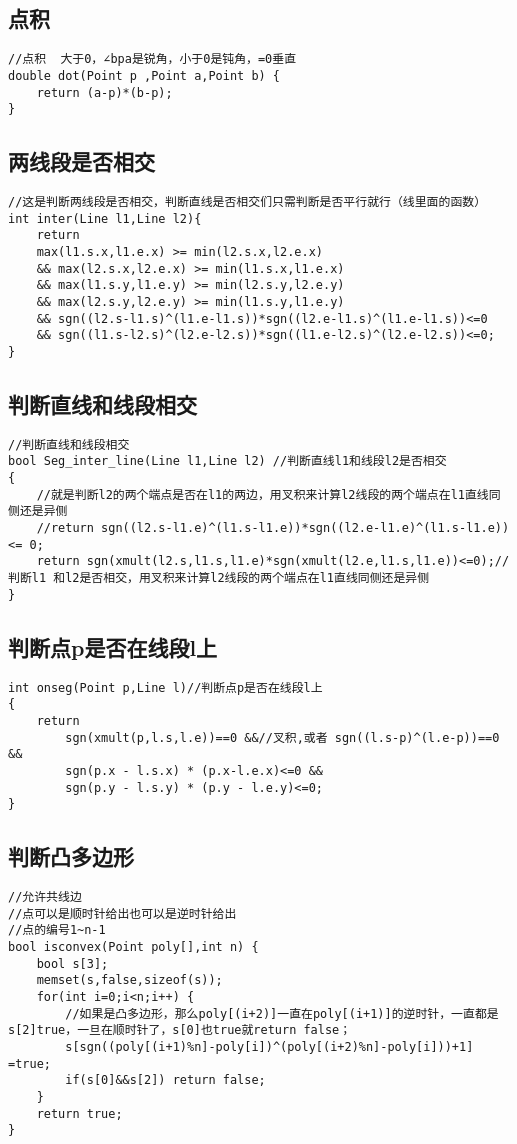 \subsection{点积}
\begin{lstlisting}
//点积  大于0，∠bpa是锐角，小于0是钝角，=0垂直
double dot(Point p ,Point a,Point b) {
	return (a-p)*(b-p);
}
\end{lstlisting}

\subsection{两线段是否相交}
\begin{lstlisting}
//这是判断两线段是否相交，判断直线是否相交们只需判断是否平行就行（线里面的函数）
int inter(Line l1,Line l2){
	return
	max(l1.s.x,l1.e.x) >= min(l2.s.x,l2.e.x)
	&& max(l2.s.x,l2.e.x) >= min(l1.s.x,l1.e.x)
	&& max(l1.s.y,l1.e.y) >= min(l2.s.y,l2.e.y)
	&& max(l2.s.y,l2.e.y) >= min(l1.s.y,l1.e.y)
	&& sgn((l2.s-l1.s)^(l1.e-l1.s))*sgn((l2.e-l1.s)^(l1.e-l1.s))<=0
	&& sgn((l1.s-l2.s)^(l2.e-l2.s))*sgn((l1.e-l2.s)^(l2.e-l2.s))<=0;
}
\end{lstlisting}

\subsection{判断直线和线段相交}
\begin{lstlisting}
//判断直线和线段相交
bool Seg_inter_line(Line l1,Line l2) //判断直线l1和线段l2是否相交
{
	//就是判断l2的两个端点是否在l1的两边，用叉积来计算l2线段的两个端点在l1直线同侧还是异侧
	//return sgn((l2.s-l1.e)^(l1.s-l1.e))*sgn((l2.e-l1.e)^(l1.s-l1.e)) <= 0;
	return sgn(xmult(l2.s,l1.s,l1.e)*sgn(xmult(l2.e,l1.s,l1.e))<=0);//判断l1 和l2是否相交，用叉积来计算l2线段的两个端点在l1直线同侧还是异侧
}
\end{lstlisting}

\subsection{判断点p是否在线段l上}
\begin{lstlisting}
int onseg(Point p,Line l)//判断点p是否在线段l上
{
	return
		sgn(xmult(p,l.s,l.e))==0 &&//叉积,或者 sgn((l.s-p)^(l.e-p))==0 &&
		sgn(p.x - l.s.x) * (p.x-l.e.x)<=0 &&
		sgn(p.y - l.s.y) * (p.y - l.e.y)<=0;
}
\end{lstlisting}

\subsection{判断凸多边形}
\begin{lstlisting}
//允许共线边
//点可以是顺时针给出也可以是逆时针给出
//点的编号1~n-1
bool isconvex(Point poly[],int n) {
	bool s[3];
	memset(s,false,sizeof(s));
	for(int i=0;i<n;i++) {
		//如果是凸多边形，那么poly[(i+2)]一直在poly[(i+1)]的逆时针，一直都是s[2]true，一旦在顺时针了，s[0]也true就return false；
		s[sgn((poly[(i+1)%n]-poly[i])^(poly[(i+2)%n]-poly[i]))+1] =true;
		if(s[0]&&s[2]) return false;
	}
	return true;
}
\end{lstlisting}

